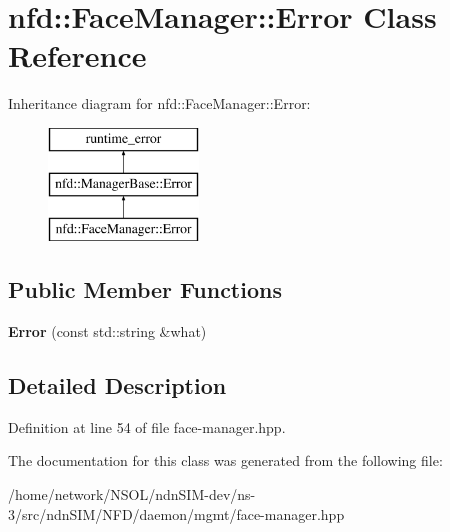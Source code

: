 \hypertarget{classnfd_1_1FaceManager_1_1Error}{}\section{nfd\+:\+:Face\+Manager\+:\+:Error Class Reference}
\label{classnfd_1_1FaceManager_1_1Error}
Inheritance diagram for nfd\+:\+:Face\+Manager\+:\+:Error\+:\begin{figure}[H]
\begin{center}
\leavevmode
\includegraphics[height=3.000000cm]{classnfd_1_1FaceManager_1_1Error}
\end{center}
\end{figure}
\subsection*{Public Member Functions}
\begin{DoxyCompactItemize}
\item 
{\bfseries Error} (const std\+::string \&what)\hypertarget{classnfd_1_1FaceManager_1_1Error_a1281099f77d21f08921b9cb1ff83d5d6}{}\label{classnfd_1_1FaceManager_1_1Error_a1281099f77d21f08921b9cb1ff83d5d6}

\end{DoxyCompactItemize}


\subsection{Detailed Description}


Definition at line 54 of file face-\/manager.\+hpp.



The documentation for this class was generated from the following file\+:\begin{DoxyCompactItemize}
\item 
/home/network/\+N\+S\+O\+L/ndn\+S\+I\+M-\/dev/ns-\/3/src/ndn\+S\+I\+M/\+N\+F\+D/daemon/mgmt/face-\/manager.\+hpp\end{DoxyCompactItemize}
